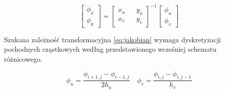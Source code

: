 \begin{equation}
\begin{bmatrix}
\phi_x \\ \phi_y
\end{bmatrix} = 
\begin{bmatrix}
x_u && y_u \\
x_v && y_v
\end{bmatrix}^{-1}
\begin{bmatrix}
\phi_u \\ \phi_v
\end{bmatrix}
\label{eq:jakobian}
\end{equation}

\noindent\newline Szukana zależność transformacyjna \ref{eq:jakobian} wymaga dyskretyzacji pochodnych cząstkowych według przedstawionego wcześniej schematu różnicowego.

\[
\phi_u = \frac{\phi_{i+1,j}-\phi_{i-1,j}}{2h_u} \quad \phi_v = \frac{\phi_{i,j}-\phi_{i,j-1}}{h_v}
\]